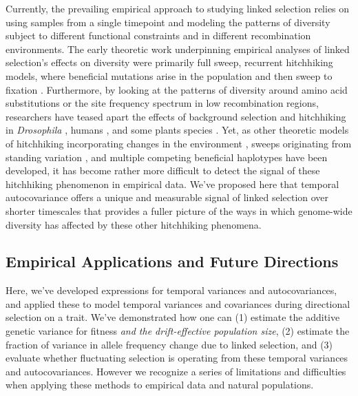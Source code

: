 \documentclass[11pt]{article}
\newcommand{\vb}[1]{{\it \color{blue} #1}}
\begin{document}
Currently, the prevailing empirical approach to studying linked selection
relies on using samples from a single timepoint and modeling the patterns of
diversity subject to different functional constraints and in different
recombination environments. The early theoretic work underpinning empirical
analyses of linked selection's effects on diversity were primarily full sweep,
recurrent hitchhiking models, where beneficial mutations arise in the
population and then sweep to fixation
\parencite{Maynard_Smith1974-lc,Stephan1992-jc,Kaplan1989-ld}. Furthermore, by
looking at the patterns of diversity around amino acid substitutions or the
site frequency spectrum in low recombination regions, researchers have teased
apart the effects of background selection and hitchhiking in \emph{Drosophila}
\parencite{Begun2007-bg,Elyashiv2016-vt}, humans
\parencite{Hernandez2011-gs,McVicker2009-ax}, and some plants species
\parencite{Nordborg2005-vt,Beissinger2016-cm,Schmid2005-on,Williamson2014-oy}.
Yet, as other theoretic models of hitchhiking incorporating changes in the
environment \parencite{Kopp2007-mc,Kopp2009-lo,Kopp2009-pj}, sweeps originating
from standing variation \parencite{Hermisson2005-hs}, and multiple competing
beneficial haplotypes \parencite{Pennings2006-lj} have been developed, it has
become rather more difficult to detect the signal of these hitchhiking
phenomenon in empirical data. We've proposed here that temporal autocovariance
offers a unique and measurable signal of linked selection over shorter
timescales that provides a fuller picture of the ways in which genome-wide
diversity has affected by these other hitchhiking phenomena. 

\subsection{Empirical Applications and Future Directions}

Here, we've developed expressions for temporal variances and autocovariances,
and applied these to model temporal variances and covariances during
directional selection on a trait. We've demonstrated how one can (1) estimate
the additive genetic variance for fitness \vb{and the drift-effective population
size}, (2) estimate the fraction of variance in allele frequency change due to
linked selection, and (3) evaluate whether fluctuating selection is operating
from these temporal variances and autocovariances. However we recognize a
series of limitations and difficulties when applying these methods to empirical
data and natural populations.
\end{document}
